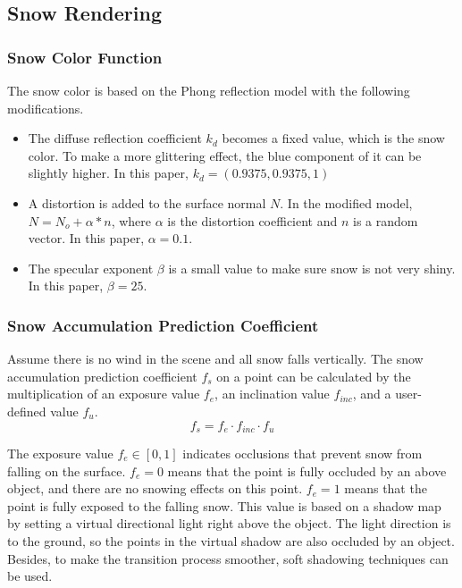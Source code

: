 \documentclass{article}
\begin{document}
\subsection {Snow Rendering}

\subsubsection {Snow Color Function}
The snow color is based on the Phong reflection model with the following modifications.

\begin{itemize}
  \item The diffuse reflection coefficient \( k_d \) becomes a fixed value, which is the snow color. To make a more glittering effect, the 
  blue component of it can be slightly higher. In this paper, \( k_d = (0.9375, 0.9375, 1)\)
  \item A distortion is added to the surface normal \( N \). In the modified model, \( N = N_{o} + \alpha * n\), where \( \alpha \) is 
  the distortion coefficient and \( n \) is a random vector. In this paper, \( \alpha = 0.1\).
  \item The specular exponent \( \beta \) is a small value to make sure snow is not very shiny. In this paper, \( \beta = 25\).
\end{itemize}

\subsubsection {Snow Accumulation Prediction Coefficient}
Assume there is no wind in the scene and all snow falls vertically. The snow accumulation prediction coefficient \( f_{s} \) on a 
point can be calculated by the multiplication of an exposure value \( f_{e} \), an inclination value \( f_{inc} \), and a user-defined 
value \( f_{u} \).
\[
  f_{s} = f_{e} \cdot f_{inc} \cdot f_{u}
\]

The exposure value \( f_{e} \in [0, 1] \) indicates occlusions that prevent snow from falling on the surface. \( f_{e}=0 \) means that 
the point is fully occluded by an above object, and there are no snowing effects on this point. \( f_{e}=1 \) means that the point is 
fully exposed to the falling snow. This value is based on a shadow map by setting a virtual directional light right above the object. 
The light direction is to the ground, so the points in the virtual shadow are also occluded by an object. Besides, to make the 
transition process smoother, soft shadowing techniques can be used. 
\end{document}
